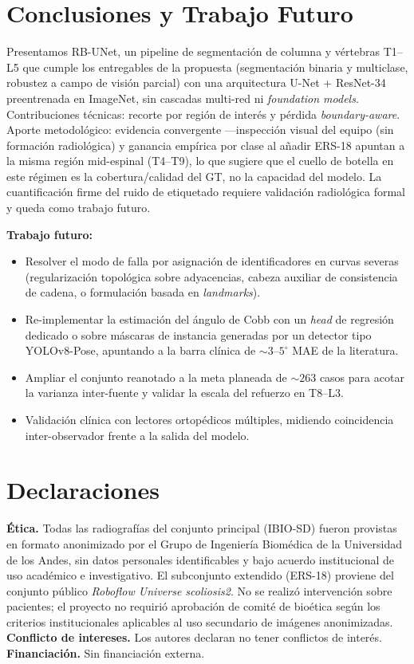 \documentclass[conference]{IEEEtran}
\begin{document}
\section{Conclusiones y Trabajo Futuro}
\label{sec:conclusiones}

Presentamos RB-UNet, un pipeline de segmentación de columna y vértebras T1--L5 que cumple los entregables de la propuesta (segmentación binaria y multiclase, robustez a campo de visión parcial) con una arquitectura U-Net + ResNet-34 preentrenada en ImageNet, sin cascadas multi-red ni \emph{foundation models}. Contribuciones técnicas: recorte por región de interés y pérdida \emph{boundary-aware}. Aporte metodológico: evidencia convergente ---inspección visual del equipo (sin formación radiológica) y ganancia empírica por clase al añadir ERS-18 apuntan a la misma región mid-espinal (T4--T9), lo que sugiere que el cuello de botella en este régimen es la cobertura/calidad del GT, no la capacidad del modelo. La cuantificación firme del ruido de etiquetado requiere validación radiológica formal y queda como trabajo futuro.

\textbf{Trabajo futuro:}
\begin{itemize}
\item Resolver el modo de falla por asignación de identificadores en curvas severas (regularización topológica sobre adyacencias, cabeza auxiliar de consistencia de cadena, o formulación basada en \emph{landmarks}).
\item Re-implementar la estimación del ángulo de Cobb con un \emph{head} de regresión dedicado o sobre máscaras de instancia generadas por un detector tipo YOLOv8-Pose, apuntando a la barra clínica de $\sim 3$--$5^{\circ}$ MAE de la literatura.
\item Ampliar el conjunto reanotado a la meta planeada de $\sim 263$ casos para acotar la varianza inter-fuente y validar la escala del refuerzo en T8--L3.
\item Validación clínica con lectores ortopédicos múltiples, midiendo coincidencia inter-observador frente a la salida del modelo.
\end{itemize}

\section*{Declaraciones}
\textbf{Ética.} Todas las radiografías del conjunto principal (IBIO-SD) fueron provistas en formato anonimizado por el Grupo de Ingeniería Biomédica de la Universidad de los Andes, sin datos personales identificables y bajo acuerdo institucional de uso académico e investigativo. El subconjunto extendido (ERS-18) proviene del conjunto público \emph{Roboflow Universe scoliosis2}. No se realizó intervención sobre pacientes; el proyecto no requirió aprobación de comité de bioética según los criterios institucionales aplicables al uso secundario de imágenes anonimizadas. \textbf{Conflicto de intereses.} Los autores declaran no tener conflictos de interés. \textbf{Financiación.} Sin financiación externa.
\end{document}
